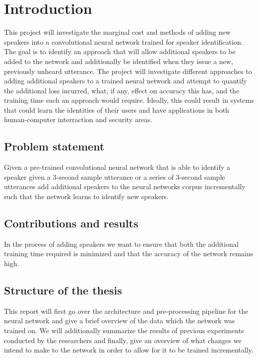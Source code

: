 %
%
\chapter{Introduction}
\label{cha:introduction}
This project will investigate the marginal cost and methods of adding new speakers into a convolutional neural network trained for speaker identification. The goal is to identify an approach that will allow additional speakers to be added to the network and additionally be identified when they issue a new, previously unheard utterance. The project will investigate different approaches to adding additional speakers to a trained neural network and attempt to quantify the additional loss incurred, what, if any, effect on accuracy this has, and the training time such an approach would require. Ideally, this could result in systems that could learn the identities of their users and have applications in both human-computer interraction and security areas.\\

\section{Problem statement}
\label{sec:introduction:problemstatement}
Given a pre-trained convolutional neural network that is able to identify a speaker given a 3-second sample utterance or a series of 3-second sample utterances add additional speakers to the neural networks corpus incrementally such that the network learns to identify new speakers.


\section{Contributions and results}
\label{sec:introduction:objective}
In the process of adding speakers we want to ensure that both the additional training time required is minimized and that the accuracy of the network remains high.


\section{Structure of the thesis}
\label{sec:introduction:structure}
This report will first go over the architecture and pre-processing pipeline for the neural network and give a brief overview of the data which the network was trained on. We will additionally summarize the results of previous experiments conducted by the researchers and finally, give an overview of what changes we intend to make to the network in order to allow for it to be trained incrementally.

